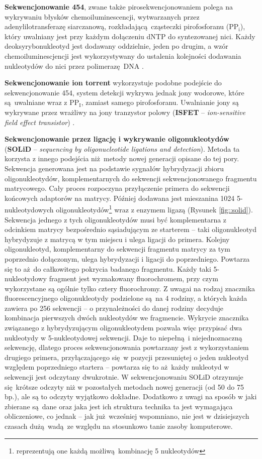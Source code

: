 \documentclass[two column, twoside, a4paper]{article}
\begin{document}
\textbf{Sekwencjonowanie 454}, zwane także pirosekwencjonowaniem polega na wykrywaniu błysków chemoiluminescencji, wytwarzanych przez adenylilotransferazę siarczanową, rozkładającą cząsteczki pirofosforanu ($\mathrm{PP_{i}}$), który uwalniany jest przy każdym dołączeniu dNTP do syntezowanej nici. Każdy deoksyrybonukleotyd jest dodawany oddzielnie, jeden po drugim, a wzór chemoiluminescjencji jest wykorzystywany do ustalenia kolejności dodawania nukleotydów do nici przez polimerazę DNA \autocite{Brown2019} \autocite{Godwin2016}.

\textbf{Sekwencjonowanie ion torrent} wykorzystuje podobne podejście do sekwencjonowanie 454, system detekcji wykrywa jednak jony wodorowe, które są uwalniane wraz z $\mathrm{PP_{I}}$, zamiast samego pirofosforanu. Uwalnianie jony są wykrywane przez wrażliwy na jony tranzystor polowy (\textbf{ISFET} -- \textit{ion-sensitive field effect transistor}) \autocite{Brown2019}.

\textbf{Sekwencjonowanie przez ligację i wykrywanie oligonukleotydów} (\textbf{SOLiD} -- \textit{sequencing by oligonucleotide ligations and detection}). Metoda ta korzysta z innego podejścia niż metody nowej generacji opisane do tej pory. Sekwencja generowana jest na podstawie sygnałów hybrydyzacji zbioru oligonukleotydów, komplementarnych do sekwencji sekwencjonowanego fragmentu matrycowego. Cały proces rozpoczyna przyłączenie primera do sekwencji końcowych adaptorów na matrycy. Później dodawana jest mieszanina 1024 5-nukleotydowych oligonukleotydów\footnote{reprezentują one każdą możliwą kombinację 5 nukleotydów} wraz z enzymem ligazą (Rysunek \ref{fig::solid}). Sekwencja jednego z tych oligonukleotydów musi być komplementarna z odcinkiem matrycy bezpośrednio sąsiadującym ze starterem -- taki oligonukleotyd hybrydyzuje z matrycą w tym miejscu i ulega ligacji do primera. Kolejny oligonukleotyd, komplementarny do sekwencji fragmentu matrycy za tym poprzednio dołączonym, ulega hybrydyzacji i ligacji do poprzedniego. Powtarza się to aż do całkowitego pokrycia badanego fragmentu. Każdy taki 5-nukleotydowy fragment jest wyznakowany fluorochromem, przy czym wykorzystane są ogólnie tylko cztery fluorochromy. Z uwagai na rodzaj znacznika fluorescencyjnego oligonukleotydy podzielone są na 4 rodziny, a których każda zawiera po 256 sekwencji -- o przynależności do danej rodziny decyduje kombinacja pierwszych dwóch nukleotydów we fragmencie. Wykrycie znacznika związanego z hybrydyzującym oligonukleotydem pozwala więc przypisać dwa nukleotydy w 5-nukleotydowej sekwencji. Daje to niepełną i niejednoznaczną sekwencję, dlatego proces sekwencjonowania powtarzany jest z wykorzystaniem drugiego primera, przyłączającego się w pozycji przesuniętej o jeden nukleotyd względem poprzedniego startera -- powtarza się to aż każdy nukleotyd w sekwencji jest odczytany dwukrotnie. W sekwencjonowaniu SOLiD otrzymuje się krótsze odczyty niż w pozostałych metodach nowej generacji (od 50 do 75 bp.), ale są to odczyty wyjątkowo dokładne. Dodatkowo z uwagi na sposób w jaki zbierane są dane oraz jaka jest ich struktura technika ta jest wymagająca obliczeniowe, co jednak -- jak już wcześniej wspomniano, nie jest w dzisiejszych czasach dużą wadą ze względu na stosunkowo tanie zasoby komputerowe. \autocite{Godwin2016} \autocite{Brown2019}
\end{document}

